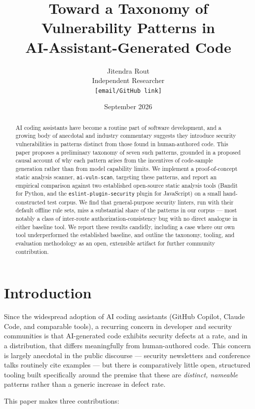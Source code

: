 \documentclass[11pt]{article}
\title{Toward a Taxonomy of Vulnerability Patterns in \\ AI-Assistant-Generated Code}
\author{Jitendra Rout \\ \small Independent Researcher \\ \small \texttt{[email/GitHub link]}}
\date{September 2026}
\begin{document}
\maketitle

\begin{abstract}
AI coding assistants have become a routine part of software development, and
a growing body of anecdotal and industry commentary suggests they introduce
security vulnerabilities in patterns distinct from those found in
human-authored code. This paper proposes a preliminary taxonomy of seven such
patterns, grounded in a proposed causal account of why each pattern arises
from the incentives of code-sample generation rather than from model
capability limits. We implement a proof-of-concept static analysis scanner,
\texttt{ai-vuln-scan}, targeting these patterns, and report an empirical
comparison against two established open-source static analysis tools
(Bandit for Python, and the \texttt{eslint-plugin-security} plugin for
JavaScript) on a small hand-constructed test corpus. We find that general-purpose
security linters, run with their default offline rule sets, miss a
substantial share of the patterns in our corpus --- most notably a class of
inter-route authorization-consistency bug with no direct analogue in either
baseline tool. We report these results candidly, including a case where our
own tool underperformed the established baseline, and outline the taxonomy,
tooling, and evaluation methodology as an open, extensible artifact for
further community contribution.
\end{abstract}

\section{Introduction}

Since the widespread adoption of AI coding assistants (GitHub Copilot,
Claude Code, and comparable tools), a recurring concern in developer and
security communities is that AI-generated code exhibits security defects at
a rate, and in a distribution, that differs meaningfully from human-authored
code. This concern is largely anecdotal in the public discourse --- security
newsletters and conference talks routinely cite examples --- but there is
comparatively little open, structured tooling built specifically around the
premise that these are \emph{distinct, nameable} patterns rather than a
generic increase in defect rate.

This paper makes three contributions:
\end{document}
